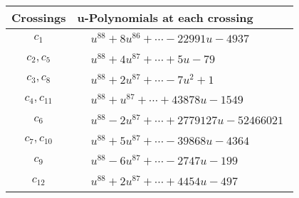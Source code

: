 \documentclass[1p]{elsarticle_modified}
\theoremstyle{definition}
\begin{document}
\begin{tabular}{m{50pt}|m{274pt}}
Crossings & \hspace{64pt}u-Polynomials at each crossing \\
\hline $$\begin{aligned}c_{1}\end{aligned}$$&$\begin{aligned}
&u^{88}+8 u^{86}+\cdots-22991 u-4937
\end{aligned}$\\
\hline $$\begin{aligned}c_{2},c_{5}\end{aligned}$$&$\begin{aligned}
&u^{88}+4 u^{87}+\cdots+5 u-79
\end{aligned}$\\
\hline $$\begin{aligned}c_{3},c_{8}\end{aligned}$$&$\begin{aligned}
&u^{88}+2 u^{87}+\cdots-7 u^2+1
\end{aligned}$\\
\hline $$\begin{aligned}c_{4},c_{11}\end{aligned}$$&$\begin{aligned}
&u^{88}+u^{87}+\cdots+43878 u-1549
\end{aligned}$\\
\hline $$\begin{aligned}c_{6}\end{aligned}$$&$\begin{aligned}
&u^{88}-2 u^{87}+\cdots+2779127 u-52466021
\end{aligned}$\\
\hline $$\begin{aligned}c_{7},c_{10}\end{aligned}$$&$\begin{aligned}
&u^{88}+5 u^{87}+\cdots-39868 u-4364
\end{aligned}$\\
\hline $$\begin{aligned}c_{9}\end{aligned}$$&$\begin{aligned}
&u^{88}-6 u^{87}+\cdots-2747 u-199
\end{aligned}$\\
\hline $$\begin{aligned}c_{12}\end{aligned}$$&$\begin{aligned}
&u^{88}+2 u^{87}+\cdots+4454 u-497
\end{aligned}$\\
\hline
\end{tabular}\\~\\
\end{document}
